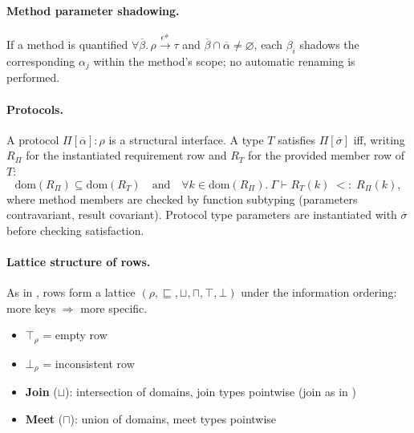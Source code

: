 \paragraph{Method parameter shadowing.}
If a method is quantified $\forall\overline{\beta}.\,\rho \xrightarrow{\epsilon^\#} \tau$ and $\overline{\beta} \cap \overline{\alpha} \neq \varnothing$, each $\beta_i$ shadows the corresponding $\alpha_j$ within the method’s scope; no automatic renaming is performed.

\paragraph{Protocols.}
A protocol $\Pi[\overline{\alpha}]: \rho$ is a structural interface.
A type $T$ satisfies $\Pi[\overline{\sigma}]$ iff, writing $R_\Pi$ for the instantiated requirement row and $R_T$ for the provided member row of $T$:
\[
\mathrm{dom}(R_\Pi) \subseteq \mathrm{dom}(R_T)
\quad\text{and}\quad
\forall k \in \mathrm{dom}(R_\Pi).\ \Gamma \vdash R_T(k) \;<:\; R_\Pi(k),
\]
where method members are checked by function subtyping (parameters contravariant, result covariant). Protocol type parameters are instantiated with $\overline{\sigma}$ before checking satisfaction.

\paragraph{Lattice structure of rows.}
As in , rows form a lattice $(\mathcal{\rho}, \sqsubseteq, \sqcup, \sqcap, \top, \bot)$ under the information ordering: more keys $\Rightarrow$ more specific.
\begin{itemize}
  \item $\top_\rho$ = empty row
  \item $\bot_\rho$ = inconsistent row
  \item \textbf{Join} ($\sqcup$): intersection of domains, join types pointwise (join as in )
  \item \textbf{Meet} ($\sqcap$): union of domains, meet types pointwise
\end{itemize}

